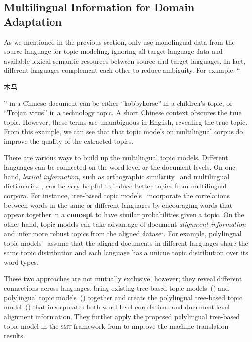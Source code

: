 \subsection{Multilingual Information for Domain Adaptation}

As we mentioned in the previous section, \citet{Eidelman-12} only use monolingual data from the source language for topic modeling, ignoring all target-language data and available lexical semantic resources between source and target languages. In fact, different languages complement each other to reduce ambiguity.  For example, ``\begin{CJK*}{UTF8}{gbsn}木马\end{CJK*}'' in a Chinese document can be either ``hobbyhorse'' in a children's topic, or ``Trojan virus'' in a technology topic.  A short Chinese context obscures the true topic. However, these terms are unambiguous in English, revealing the true topic. From this example, we can see that that topic models on multilingual corpus do improve the quality of the extracted topics.

There are various ways to build up the multilingual topic models. Different languages can be connected on the word-level or the document levels. 
On one hand, \emph{lexical information}, such as orthographic similarity~\citep{boyd-graber-09} and multilingual dictionaries~\citep{boyd-graber-10}, can be very helpful to induce better topics from multilingual corpora. For instance, tree-based topic models~\citep{boyd-graber-07,andrzejewski-09,Hu:Boyd-Graber:Satinoff-ur} incorporate the correlations between words in the same or different languages by encouraging words that appear together in a {\bf concept} to have similar probabilities given a topic. 
On the other hand, topic models can take advantage of document \emph{alignment information} and infer more robust topics from the aligned dataset. For example, polylingual topic models~\citep{mimno-09} assume that the aligned documents in different languages share the same topic distribution and each language has a unique topic distribution over its word types. 

These two approaches are not mutually exclusive, however; they reveal different connections across languages. \citet{hu-14} bring existing tree-based topic models~(\tlda{}) and polylingual topic models~(\plda{}) together and create the polylingual tree-based topic model~(\ptlda{}) that incorporates both word-level correlations and document-level alignment information. They further apply the proposed polylingual tree-based topic model in the \textsc{smt} framework from \citet{Eidelman-12} to improve the machine translation results.





